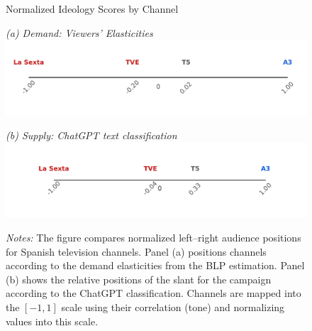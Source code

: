 \documentclass[12pt]{article}
\begin{document}
	
	
	\begin{figure}[ht]
		\centering
		\caption{Normalized Ideology Scores by Channel}
		\begin{minipage}[t]{0.48\textwidth}
			\centering
			\textit{(a) Demand: Viewers' Elasticities}
			\includegraphics[width=\linewidth]{figures/congress_line_audience_share}
		\end{minipage}
		\hfill
		\begin{minipage}[t]{0.48\textwidth}
			\centering
			
			
			\textit{(b) Supply: ChatGPT text classification}
			\includegraphics[width=\linewidth]{figures/congress_line_chatgpt_campaign}
			
			
		\end{minipage}
		
		
		\caption*{\small \textit{Notes:} The figure compares normalized left–right audience positions for Spanish television channels. Panel (a) positions channels according to the demand elasticities from the BLP estimation. Panel (b) shows the relative  positions of the slant for the campaign according to the ChatGPT classification. 			Channels are mapped into the $[-1,1]$ scale using their correlation (tone) and normalizing values into this scale. }
		\label{fig:channel_ideology_lines2}
	\end{figure}
	
	
	
\end{document}
